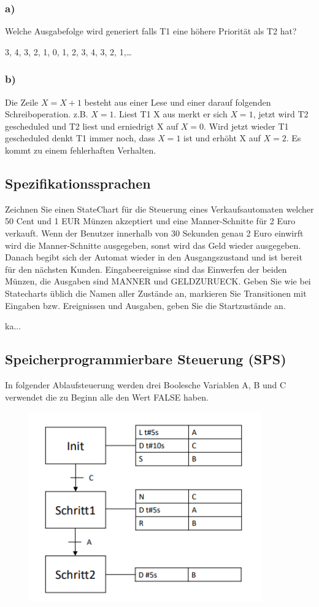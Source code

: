 \subsubsection{a)}
Welche Ausgabefolge wird generiert falls T1 eine höhere Priorität als T2 hat?

3, 4, 3, 2, 1, 0, 1, 2, 3, 4, 3, 2, 1,\dots

\subsubsection{b)}
Die Zeile $X = X + 1$ besteht aus einer Lese und einer darauf folgenden Schreiboperation.
z.B. $X=1$. Liest T1 X aus merkt er sich $X=1$, jetzt wird T2 gescheduled und T2 liest und erniedrigt X auf $X=0$.
Wird jetzt wieder T1 gescheduled denkt T1 immer noch, dass $X=1$ ist und erhöht X auf $X=2$. Es kommt zu einem
fehlerhaften Verhalten.

\subsection{Spezifikationssprachen}
Zeichnen Sie einen StateChart für die Steuerung eines Verkaufsautomaten welcher 50 Cent und 1 EUR
Münzen akzeptiert und eine Manner-Schnitte für 2 Euro verkauft. Wenn der Benutzer innerhalb von 30
Sekunden genau 2 Euro einwirft wird die Manner-Schnitte ausgegeben, sonst wird das Geld wieder
ausgegeben. Danach begibt sich der Automat wieder in den Ausgangszustand und ist bereit für den
nächsten Kunden. Eingabeereignisse sind das Einwerfen der beiden Münzen, die Ausgaben sind MANNER
und GELDZURUECK.
Geben Sie wie bei Statecharts üblich die Namen aller Zustände an, markieren Sie Transitionen mit Eingaben
bzw. Ereignissen und Ausgaben, geben Sie die Startzustände an.

ka...
\subsection{Speicherprogrammierbare Steuerung (SPS)}
In folgender Ablaufsteuerung werden drei Boolesche Variablen A, B und C verwendet die zu Beginn alle den
Wert FALSE haben. 

\begin{figure}[H]
  \includegraphics[width=10cm]{images/KA140421/6a.PNG}
  \centering
\end{figure}

